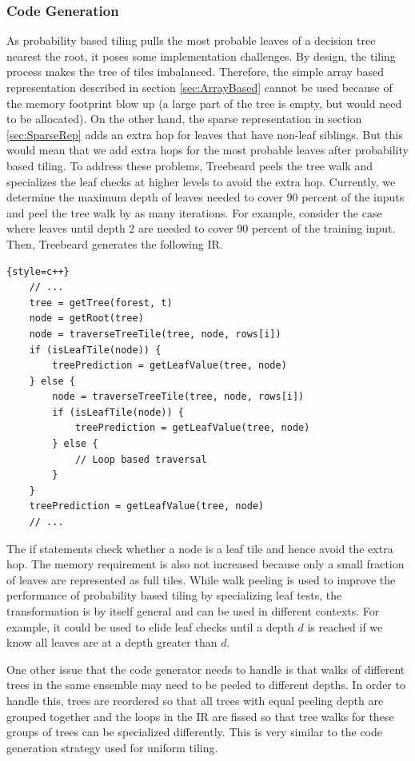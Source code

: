 \subsubsection{Code Generation}
As probability based tiling pulls the most probable leaves of a decision tree nearest the root, it poses 
some implementation challenges. By design, the tiling process makes the tree of tiles 
imbalanced. Therefore, the simple array based representation described in section \ref{sec:ArrayBased}
cannot be used because of the memory footprint blow up (a large part of the tree is empty, but would 
need to be allocated). On the other hand, the sparse representation in section \ref{sec:SparseRep} adds 
an extra hop for leaves that have non-leaf siblings. But this would mean that we add extra hops for 
the most probable leaves after probability based tiling. To address these problems, Treebeard peels 
the tree walk and specializes the leaf checks at higher levels to avoid the extra hop. Currently, 
we determine the maximum depth of leaves needed to cover 90 percent of the inputs and peel the tree 
walk by as many iterations. For example, consider the case where leaves until depth 2 are needed to 
cover 90 percent of the training input. Then, Treebeard generates the following IR. 

\begin{lstlisting}{style=c++}
    // ...
    tree = getTree(forest, t)
    node = getRoot(tree)
    node = traverseTreeTile(tree, node, rows[i])
    if (isLeafTile(node)) {
        treePrediction = getLeafValue(tree, node)
    } else {    
        node = traverseTreeTile(tree, node, rows[i])
        if (isLeafTile(node)) {
            treePrediction = getLeafValue(tree, node)
        } else {    
            // Loop based traversal 
        }
    }
    treePrediction = getLeafValue(tree, node)
    // ...
\end{lstlisting}

The if statements check whether a node is a leaf tile and hence avoid the extra hop. The memory 
requirement is also not increased because only a small fraction of leaves are represented as full tiles.
While walk peeling is used to improve the performance of probability based tiling by specializing leaf tests,
the transformation is by itself general and can be used in different contexts. For example, it could be used 
to elide leaf checks until a depth $d$ is reached if we know all leaves are at a depth greater than $d$. 

One other issue that the code generator needs to handle is that walks of different trees in the same ensemble may 
need to be peeled to different depths. In order to handle this, trees are reordered so that all trees 
with equal peeling depth are grouped together and the loops in the IR are fissed so that tree walks 
for these groups of trees can be specialized differently. This is very similar to the code generation strategy
used for uniform tiling.

